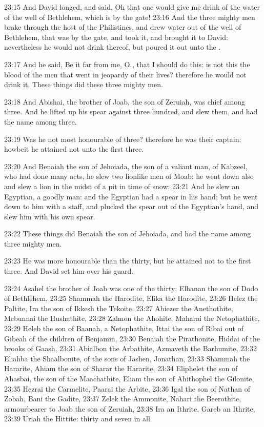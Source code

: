 23:15 And David longed, and said, Oh that one would give me drink of the water of the well of Bethlehem, which is by the gate!  23:16 And the three mighty men brake through the host of the Philistines, and drew water out of the well of Bethlehem, that was by the gate, and took it, and brought it to David: nevertheless he would not drink thereof, but poured it out unto the \LORD.

23:17 And he said, Be it far from me, O \LORD, that I should do this: is not this the blood of the men that went in jeopardy of their lives?  therefore he would not drink it. These things did these three mighty men.

23:18 And Abishai, the brother of Joab, the son of Zeruiah, was chief among three. And he lifted up his spear against three hundred, and slew them, and had the name among three.

23:19 Was he not most honourable of three? therefore he was their captain: howbeit he attained not unto the first three.

23:20 And Benaiah the son of Jehoiada, the son of a valiant man, of Kabzeel, who had done many acts, he slew two lionlike men of Moab: he went down also and slew a lion in the midst of a pit in time of snow: 23:21 And he slew an Egyptian, a goodly man: and the Egyptian had a spear in his hand; but he went down to him with a staff, and plucked the spear out of the Egyptian's hand, and slew him with his own spear.

23:22 These things did Benaiah the son of Jehoiada, and had the name among three mighty men.

23:23 He was more honourable than the thirty, but he attained not to the first three. And David set him over his guard.

23:24 Asahel the brother of Joab was one of the thirty; Elhanan the son of Dodo of Bethlehem, 23:25 Shammah the Harodite, Elika the Harodite, 23:26 Helez the Paltite, Ira the son of Ikkesh the Tekoite, 23:27 Abiezer the Anethothite, Mebunnai the Hushathite, 23:28 Zalmon the Ahohite, Maharai the Netophathite, 23:29 Heleb the son of Baanah, a Netophathite, Ittai the son of Ribai out of Gibeah of the children of Benjamin, 23:30 Benaiah the Pirathonite, Hiddai of the brooks of Gaash, 23:31 Abialbon the Arbathite, Azmaveth the Barhumite, 23:32 Eliahba the Shaalbonite, of the sons of Jashen, Jonathan, 23:33 Shammah the Hararite, Ahiam the son of Sharar the Hararite, 23:34 Eliphelet the son of Ahasbai, the son of the Maachathite, Eliam the son of Ahithophel the Gilonite, 23:35 Hezrai the Carmelite, Paarai the Arbite, 23:36 Igal the son of Nathan of Zobah, Bani the Gadite, 23:37 Zelek the Ammonite, Nahari the Beerothite, armourbearer to Joab the son of Zeruiah, 23:38 Ira an Ithrite, Gareb an Ithrite, 23:39 Uriah the Hittite: thirty and seven in all.

